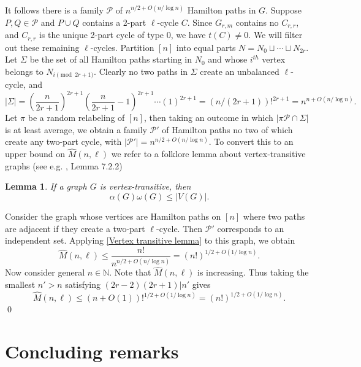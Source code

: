 \documentclass[12pt]{article}
\newtheorem{lemma}{Lemma}
\def\john#1{\noindent
\textcolor{green}
{\textsc{(John:}
\textsf{#1})}}
\begin{document}
It follows there is a family $\mathcal P$ of $n^{n/2+O(n/\log n)}$ Hamilton paths in $G$. Suppose $P,Q\in\mathcal P$ and $P\cup Q$ contains a 2-part $\ell$-cycle $C$. Since $G_{r,m}$ contains no $C_{r,r}$, and $C_{r,r}$ is the unique 2-part cycle of type 0, we have $t(C)\ne 0$. We will filter out these remaining $\ell$-cycles. Partition $[n]$ into equal parts $N=N_0\sqcup\cdots\sqcup N_{2r}$. Let $\Sigma$ be the set of all Hamilton paths starting in $N_0$ and whose $i^{th}$ vertex belongs to $N_{i\pmod{2r+1}}.$ Clearly no two paths in $\Sigma$ create an unbalanced $\ell$-cycle, and
    $$|\Sigma|=\left(\frac{n}{2r+1}\right)^{2r+1}\left(\frac{n}{2r+1}-1\right)^{2r+1}\cdots(1)^{2r+1}=(n/(2r+1))!^{2r+1}=n^{n+O(n/\log n)}.$$
Let $\pi$ be a random relabeling of $[n]$, then taking an outcome in which $|\pi\mathcal P\cap\Sigma|$ is at least average, we obtain a family $\mathcal P'$ of Hamilton paths no two of which create any two-part cycle, with $|\mathcal P'|=n^{n/2+O(n/\log n)}$. To convert this to an upper bound on $\hat M(n,\ell)$ we refer to a folklore lemma about vertex-transitive graphs (see e.g. \cite{godsil2001algebraic}, Lemma 7.2.2) 
\begin{lemma} \label{Vertex transitive lemma}
If a graph $G$ is vertex-transitive, then
$$\alpha(G)\omega(G)\le|V(G)|.$$
\end{lemma}
 Consider the graph whose vertices are Hamilton paths on $[n]$ where two paths are adjacent if they create a two-part $\ell$-cycle. Then $\mathcal{P}'$ corresponds to an independent set. Applying \autoref{Vertex transitive lemma} to this graph, we obtain $$\hat M(n,\ell)\le\frac{n!}{n^{n/2+O(n/\log n)}}=(n!)^{1/2+O(1/\log n)}.$$
Now consider general $n\in\mathbb N$. Note that $\hat M(n,\ell)$ is increasing. Thus taking the smallest $n'>n$ satisfying $(2r-2)(2r+1)|n'$ gives
$$\hat M(n,\ell)\le (n+O(1))!^{1/2+O(1/\log n)}=(n!)^{1/2+O(1/\log n)}.$$
\qed



\section{Concluding remarks} \label{Concluding remarks}

\end{document}
